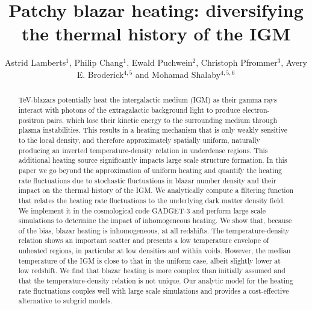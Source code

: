 \documentclass[numberedappendix]{emulateapj}
\newcommand\ALc[1]{{\color{red} \bf #1}} %
\begin{document}
\title{\ALc{Patchy blazar heating: diversifying the thermal history of the IGM}}
\author{Astrid Lamberts$^1$, Philip Chang$^1$, Ewald Puchwein$^2$, Christoph Pfrommer$^3$, Avery E. Broderick$^{4,5}$ and Mohamad Shalaby$^{4,5,6}$}
\begin{abstract}
TeV-blazars potentially heat the intergalactic medium (IGM) as their gamma rays interact with photons of the extragalactic background light to produce electron-positron pairs, which lose their kinetic energy to the surrounding medium through plasma instabilities. This results in a heating mechanism that is only weakly sensitive to the local density, and therefore approximately spatially uniform, naturally  producing an inverted temperature-density relation in underdense regions. This additional heating source significantly impacts large scale structure formation. In this paper we go beyond the approximation of uniform heating and quantify the heating rate fluctuations due to stochastic fluctuations in blazar number density and their impact on the thermal history of the IGM. We analytically compute a filtering function that relates the heating rate fluctuations to the underlying dark matter density field. We implement it in the cosmological code GADGET-3 and perform large scale simulations to determine the impact of inhomogeneous heating. We show that, because of the bias, blazar heating is inhomogeneous, at all redshifts. The temperature-density relation shows an important scatter and presents a low temperature envelope of unheated regions, in particular at low densities and within voids. However, the median temperature of the IGM is close to that in the uniform case, albeit slightly lower at low redshift. We find that blazar heating is more complex than initially assumed and that the temperature-density relation is not unique. Our analytic model for the heating rate fluctuations couples well with large scale simulations and provides a cost-effective alternative to subgrid models.
\end{abstract}
\end{document}
